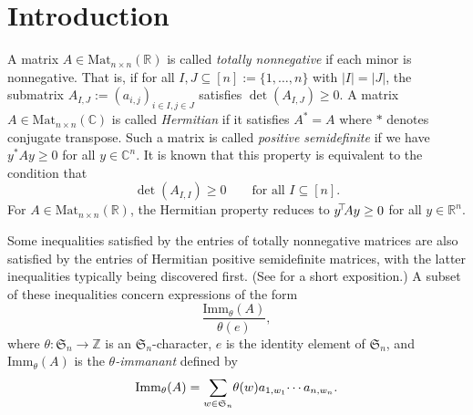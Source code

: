 \documentclass[12pt]{amsart}
\numberwithin{equation}{section}
\newcommand{\sn}{\mathfrak{S}_n}
\newcommand{\imm}[1]{\mathrm{Imm}_{#1}}
\newcommand{\defeq}{:=}
\newcommand{\tr}{{\negthickspace \top \negthickspace}}
\newcommand{\ntnsp}{\negthinspace}
\newcommand{\permmon}[2]{#1_{1,#2_1} \ntnsp\cdots {#1}_{n,#2_n}}
\begin{document}
\section{Introduction}\label{s:intro}
A matrix $A \in \mathrm{Mat}_{n \times n}(\mathbb R)$
is called {\em totally nonnegative}
if each minor is nonnegative.
That is, if for all $I, J \subseteq [n] \defeq \{1,\dotsc,n\}$ with $|I| = |J|$,
the submatrix $A_{I,J} \defeq (a_{i,j})_{i \in I, j \in J}$ satisfies
$\det(A_{I,J}) \geq 0$.
A matrix $A \in \mathrm{Mat}_{n \times n}(\mathbb C)$ is called
{\em Hermitian} if it satisfies $A^* = A$ where $*$ denotes conjugate
transpose. Such a matrix is called {\em positive semidefinite}
if we have $y^* A y \geq 0$ for all $y \in \mathbb C^n$.
It is known that this property is equivalent to the condition that
\begin{equation}\label{eq:HPSDminors}
  \det(A_{I,I}) \geq 0 \qquad \text{for all } I \subseteq [n].
  \end{equation}
For $A \in \mathrm{Mat}_{n \times n}(\mathbb R)$, the Hermitian property
reduces to $y^\tr A y \geq 0$ for all $y \in \mathbb R^n$.

Some inequalities satisfied by the entries of
totally nonnegative matrices
are also satisfied by the entries of
Hermitian positive semidefinite matrices, with the latter inequalities
typically being discovered first.
(See \cite[\S 1]{SkanSoskinBJ} for a short exposition.)
A subset of these inequalities concern
expressions
of the form
\begin{equation}\label{eq:immfrac}
  \frac{\imm{\theta}(A)}{\theta(e)},
\end{equation}
where $\theta: \sn \rightarrow \mathbb Z$ is an $\sn$-character,
$e$ is the identity element of $\sn$, and $\imm{\theta}(A)$ is the
{\em $\theta$-immanant}
defined by
\begin{equation}\label{eq:immdef}
  \imm{\theta}(A) = \sum_{w \in \sn} \ntnsp \theta(w) \permmon aw.
\end{equation}
\end{document}
